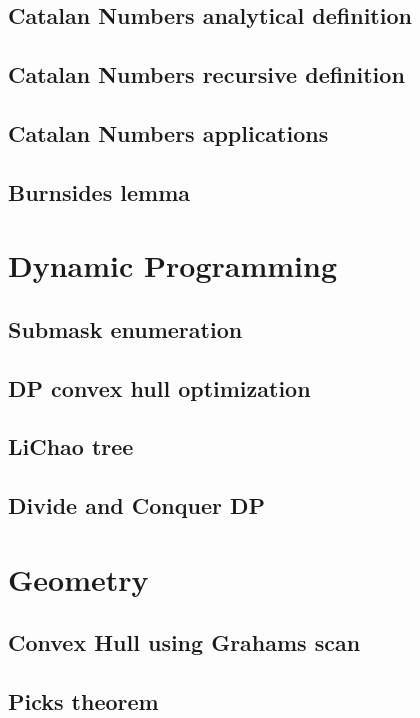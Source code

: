 \subsection{Catalan Numbers analytical definition}
\subsection{Catalan Numbers recursive definition}
\subsection{Catalan Numbers applications}
\subsection{Burnsides lemma}


\section{Dynamic Programming}
\subsection{Submask enumeration}
\subsection{DP convex hull optimization}
\subsection{LiChao tree}
\subsection{Divide and Conquer DP}

\section{Geometry}
\subsection{Convex Hull using Grahams scan}
\subsection{Picks theorem}

